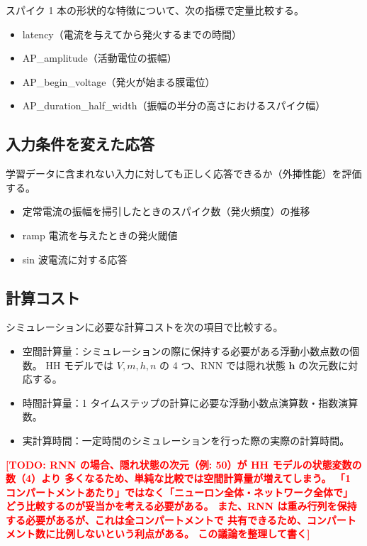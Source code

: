 \documentclass[a4paper,11pt,openany]{ltjsreport}
\newcommand{\TODO}[1]{\textcolor{red}{\textbf{[TODO: #1]}}}
\begin{document}
スパイク 1 本の形状的な特徴について、次の指標で定量比較する。

\begin{itemize}
  \item latency（電流を与えてから発火するまでの時間）
  \item AP\_amplitude（活動電位の振幅）
  \item AP\_begin\_voltage（発火が始まる膜電位）
  \item AP\_duration\_half\_width（振幅の半分の高さにおけるスパイク幅）
\end{itemize}

\subsection{入力条件を変えた応答}

学習データに含まれない入力に対しても正しく応答できるか（外挿性能）を評価する。

\begin{itemize}
  \item 定常電流の振幅を掃引したときのスパイク数（発火頻度）の推移
  \item ramp 電流を与えたときの発火閾値
  \item sin 波電流に対する応答
\end{itemize}

\subsection{計算コスト}

シミュレーションに必要な計算コストを次の項目で比較する。

\begin{itemize}
  \item 空間計算量：シミュレーションの際に保持する必要がある浮動小数点数の個数。
        HH モデルでは $V, m, h, n$ の 4 つ、RNN では隠れ状態 $\bm{h}$ の次元数に対応する。
  \item 時間計算量：1 タイムステップの計算に必要な浮動小数点演算数・指数演算数。
  \item 実計算時間：一定時間のシミュレーションを行った際の実際の計算時間。
\end{itemize}

\TODO{RNN の場合、隠れ状態の次元（例: 50）が HH モデルの状態変数の数（4）より
      多くなるため、単純な比較では空間計算量が増えてしまう。
      「1 コンパートメントあたり」ではなく「ニューロン全体・ネットワーク全体で」
      どう比較するのが妥当かを考える必要がある。
      また、RNN は重み行列を保持する必要があるが、これは全コンパートメントで
      共有できるため、コンパートメント数に比例しないという利点がある。
      この議論を整理して書く}
\end{document}

